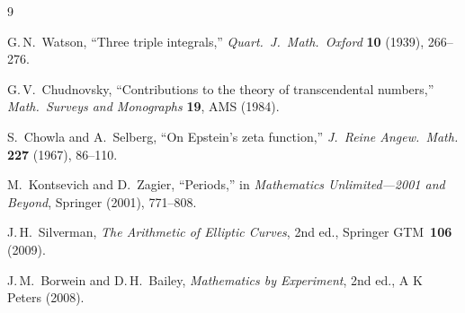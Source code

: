 \documentclass[12pt]{article}
\theoremstyle{definition}
\theoremstyle{remark}
\begin{document}
\begin{thebibliography}{9}

G.\,N.\ Watson, ``Three triple integrals,'' \textit{Quart.\ J.\ Math.\ Oxford} \textbf{10} (1939), 266--276.

G.\,V.\ Chudnovsky, ``Contributions to the theory of transcendental numbers,'' \textit{Math.\ Surveys and Monographs} \textbf{19}, AMS (1984).

S.\ Chowla and A.\ Selberg, ``On Epstein's zeta function,'' \textit{J.\ Reine Angew.\ Math.} \textbf{227} (1967), 86--110.

M.\ Kontsevich and D.\ Zagier, ``Periods,'' in \textit{Mathematics Unlimited---2001 and Beyond}, Springer (2001), 771--808.

J.\,H.\ Silverman, \textit{The Arithmetic of Elliptic Curves}, 2nd ed., Springer GTM~\textbf{106} (2009).

J.\,M.\ Borwein and D.\,H.\ Bailey, \textit{Mathematics by Experiment}, 2nd ed., A K Peters (2008).

\end{thebibliography}
\end{document}
